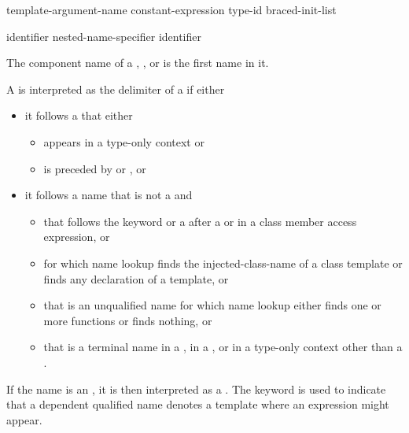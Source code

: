 \begin{bnf}
\br
  template-argument-name\br
  constant-expression\br
  type-id\br
  braced-init-list
\end{bnf}

\begin{bnf}
\br
   identifier\br
  nested-name-specifier  identifier
\end{bnf}

\pnum
{}%
The component name of a
,
, or
is the first name in it.

\pnum
A \tcode{<} is interpreted as the delimiter of
a 
if either
\begin{itemize}
\item
it follows a  that either
\begin{itemize}
\item appears in a type-only context or
\item is preceded by  or , or
\end{itemize}
\item
it follows a name that is not a  and
\begin{itemize}
\item
that follows the keyword  or a \tcode{\~}
after a  or
in a class member access expression, or
\item
for which name lookup finds the injected-class-name of a class template or
finds any declaration of a template, or
\item
that is an unqualified name
for which name lookup either finds one or more functions or finds nothing, or
\item
that is a terminal name
in a ,
in a , or
in a type-only context
other than a .
\end{itemize}
\end{itemize}
\begin{note}
If the name is an ,
it is then interpreted as a .
The keyword  is used to indicate
that a dependent qualified name denotes a template
where an expression might appear.
\end{note}

